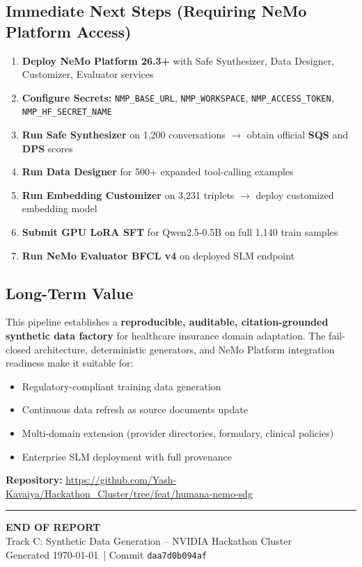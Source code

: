 \documentclass[11pt,a4paper]{article}
\begin{document}
\subsection{Immediate Next Steps (Requiring NeMo Platform Access)}
\begin{enumerate}[label=\textcolor{nvidiaGreen}{\textbf{\arabic.}}, leftmargin=*]
    \item \textbf{Deploy NeMo Platform 26.3+} with Safe Synthesizer, Data Designer, Customizer, Evaluator services
    \item \textbf{Configure Secrets:} \texttt{NMP\_BASE\_URL}, \texttt{NMP\_WORKSPACE}, \texttt{NMP\_ACCESS\_TOKEN}, \texttt{NMP\_HF\_SECRET\_NAME}
    \item \textbf{Run Safe Synthesizer} on 1,200 conversations $\to$ obtain official \textbf{SQS} and \textbf{DPS} scores
    \item \textbf{Run Data Designer} for 500+ expanded tool-calling examples
    \item \textbf{Run Embedding Customizer} on 3,231 triplets $\to$ deploy customized embedding model
    \item \textbf{Submit GPU LoRA SFT} for Qwen2.5-0.5B on full 1,140 train samples
    \item \textbf{Run NeMo Evaluator BFCL v4} on deployed SLM endpoint
\end{enumerate}

\subsection{Long-Term Value}
This pipeline establishes a \textbf{reproducible, auditable, citation-grounded synthetic data factory} for healthcare insurance domain adaptation. The fail-closed architecture, deterministic generators, and NeMo Platform integration readiness make it suitable for:
\begin{itemize}[label=\textcolor{nvidiaGreen}{$\triangleright$}, leftmargin=*]
    \item Regulatory-compliant training data generation
    \item Continuous data refresh as source documents update
    \item Multi-domain extension (provider directories, formulary, clinical policies)
    \item Enterprise SLM deployment with full provenance
\end{itemize}

\medskip
\noindent\textbf{Repository:} \url{https://github.com/Yash-Kavaiya/Hackathon_Cluster/tree/feat/humana-nemo-sdg}

\vfill
\begin{center}
{\color{nvidiaGreen}\rule{0.8\linewidth}{2pt}}
\vspace{0.5cm}
{\Large\color{nvidiaText}\textbf{END OF REPORT}}\\
\vspace{0.3cm}
{\color{nvidiaBlue}Track C: Synthetic Data Generation -- NVIDIA Hackathon Cluster}\\
{\color{nvidiaTextLight}Generated \today\ | Commit \texttt{daa7d0b094af}}
\end{center}

\label{LastPage}
\end{document}
